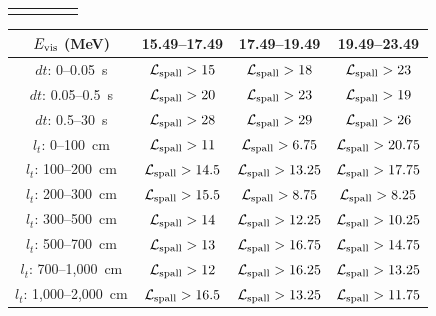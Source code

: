 \begin{table}[p]
\begin{tabular}{ccccc}
		                         &                                   &                                  &                                  &
	\end{tabular}
	\begin{tabular}{cccc} \hline \hline
		$E_{\rm vis}$ (MeV)      & 15.49--17.49                     & 17.49--19.49                      & 19.49--23.49                      \\ \hline
		$dt$: 0--0.05~s          & $\mathcal{L}_{\rm spall} > 15$   & $\mathcal{L}_{\rm spall} > 18$    & $\mathcal{L}_{\rm spall} > 23$    \\
		$dt$: 0.05--0.5~s        & $\mathcal{L}_{\rm spall} > 20$   & $\mathcal{L}_{\rm spall} > 23$    & $\mathcal{L}_{\rm spall} > 19$    \\
		$dt$: 0.5--30~s          & $\mathcal{L}_{\rm spall} > 28$   & $\mathcal{L}_{\rm spall} > 29$    & $\mathcal{L}_{\rm spall} > 26$    \\
		$l_{t}$: 0--100~cm       & $\mathcal{L}_{\rm spall} > 11$   & $\mathcal{L}_{\rm spall} > 6.75$  & $\mathcal{L}_{\rm spall} > 20.75$ \\
		$l_{t}$: 100--200~cm     & $\mathcal{L}_{\rm spall} > 14.5$ & $\mathcal{L}_{\rm spall} > 13.25$ & $\mathcal{L}_{\rm spall} > 17.75$ \\
		$l_{t}$: 200--300~cm     & $\mathcal{L}_{\rm spall} > 15.5$ & $\mathcal{L}_{\rm spall} > 8.75$  & $\mathcal{L}_{\rm spall} > 8.25$  \\
		$l_{t}$: 300--500~cm     & $\mathcal{L}_{\rm spall} > 14$   & $\mathcal{L}_{\rm spall} > 12.25$ & $\mathcal{L}_{\rm spall} > 10.25$ \\
		$l_{t}$: 500--700~cm     & $\mathcal{L}_{\rm spall} > 13$   & $\mathcal{L}_{\rm spall} > 16.75$ & $\mathcal{L}_{\rm spall} > 14.75$ \\
		$l_{t}$: 700--1,000~cm   & $\mathcal{L}_{\rm spall} > 12$   & $\mathcal{L}_{\rm spall} > 16.25$ & $\mathcal{L}_{\rm spall} > 13.25$ \\
		$l_{t}$: 1,000--2,000~cm & $\mathcal{L}_{\rm spall} > 16.5$ & $\mathcal{L}_{\rm spall} > 13.25$ & $\mathcal{L}_{\rm spall} > 11.75$ \\ \hline \hline
	\end{tabular}
\end{table}


